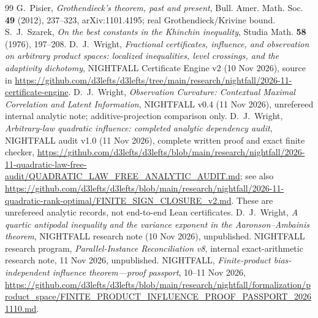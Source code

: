 \documentclass[11pt]{article}
\numberwithin{equation}{section}
\theoremstyle{remark}
\begin{document}
\begin{thebibliography}{99}
 G.~Pisier, \emph{Grothendieck's theorem, past and present}, Bull. Amer. Math. Soc. \textbf{49} (2012), 237--323, arXiv:1101.4195; real Grothendieck/Krivine bound.
 S.~J.~Szarek, \emph{On the best constants in the Khinchin inequality}, Studia Math. \textbf{58} (1976), 197--208.
 D.~J.~Wright, \emph{Fractional certificates, influence, and observation on arbitrary product spaces: localized inequalities, level crossings, and the adaptivity dichotomy}, NIGHTFALL Certificate Engine v2 (10 Nov 2026), source in \url{https://github.com/d3lefts/d3lefts/tree/main/research/nightfall/2026-11-certificate-engine}.
 D.~J.~Wright, \emph{Observation Curvature: Contextual Maximal Correlation and Latent Information}, NIGHTFALL v0.4 (11 Nov 2026), unrefereed internal analytic note; additive-projection comparison only.
 D.~J.~Wright, \emph{Arbitrary-law quadratic influence: completed analytic dependency audit}, NIGHTFALL audit v1.0 (11 Nov 2026), complete written proof and exact finite checker, \url{https://github.com/d3lefts/d3lefts/blob/main/research/nightfall/2026-11-quadratic-law-free-audit/QUADRATIC_LAW_FREE_ANALYTIC_AUDIT.md}; see also \url{https://github.com/d3lefts/d3lefts/blob/main/research/nightfall/2026-11-quadratic-rank-optimal/FINITE_SIGN_CLOSURE_v2.md}. These are unrefereed analytic records, not end-to-end Lean certificates.
 D.~J.~Wright, \emph{A quartic antipodal inequality and the variance exponent in the Aaronson--Ambainis theorem}, NIGHTFALL research note (10 Nov 2026), unpublished.
 NIGHTFALL research program, \emph{Parallel-Instance Reconciliation v8}, internal exact-arithmetic research note, 11 Nov 2026, unpublished.
 NIGHTFALL, \emph{Finite-product bias-independent influence theorem---proof passport}, 10--11 Nov 2026, \url{https://github.com/d3lefts/d3lefts/blob/main/research/nightfall/formalization/product_space/FINITE_PRODUCT_INFLUENCE_PROOF_PASSPORT_20261110.md}.
\end{thebibliography}
\end{document}
